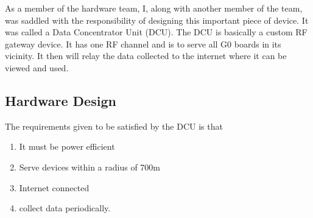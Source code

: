 As a member of the hardware team, I, along with another member of the team, was saddled with the responsibility of designing this important piece of device. It was called a Data Concentrator Unit (DCU). The DCU is basically a custom RF gateway device. It has one RF channel and is to serve all G0 boards in its vicinity. It then will relay the data collected to the internet where it can be viewed and used.

\subsection{Hardware Design}
The requirements given to be satisfied by the DCU is that
\begin{enumerate}
\item It must be power efficient
\item Serve devices within a radius of 700m
\item Internet connected
\item collect data periodically.
\end{enumerate}
  
